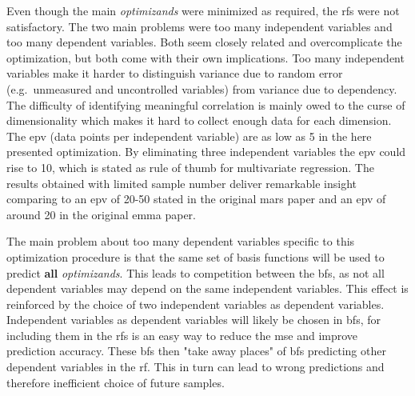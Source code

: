 Even though the main \textit{optimizands} were minimized as required, the \gls{rf}s were not satisfactory. 
The two main problems were too many independent variables and too many dependent variables. 
Both seem closely related and overcomplicate the optimization, but both come with their own implications. 
Too many independent variables make it harder to distinguish variance due to random error (e.g.\ unmeasured and uncontrolled variables) from variance due to dependency. %
The difficulty of identifying meaningful correlation is mainly owed to the curse of dimensionality\cite{friedman1988fitting} which makes it hard to collect enough data for each dimension. 
%
The \gls{epv} (data points per independent variable) are as low as 5 in the here presented optimization. %
By eliminating three independent variables the \gls{epv} could rise to 10, which is stated 
as rule of thumb for multivariate regression\cite{vittinghoff2007relaxing}. 
The results obtained with limited sample number deliver remarkable insight %
comparing to an \gls{epv} of 20-50 stated in the original \gls{mars} paper\cite{friedman1991multivariate} 
and an \gls{epv} of around 20 in the original \gls{emma} paper\cite{villanova2010function}. 
%

The main problem about too many dependent variables specific to this optimization procedure 
is that the same set of basis functions will be used to predict \textbf{all} \textit{optimizands}.
This leads to competition between the \gls{bf}s, as not all dependent variables may depend on the same independent variables. 
This effect is reinforced by the choice of two independent variables as dependent variables. %
Independent variables as dependent variables will likely be chosen in \gls{bf}s, 
for including them in the \gls{rf}s is an easy way to reduce the \gls{mse} and improve prediction accuracy.
\enlargethispage{\baselineskip}
These \gls{bf}s then "take away places" of \gls{bf}s predicting other dependent variables in the \gls{rf}. %
This in turn can lead to wrong predictions and therefore inefficient choice of future samples. 


